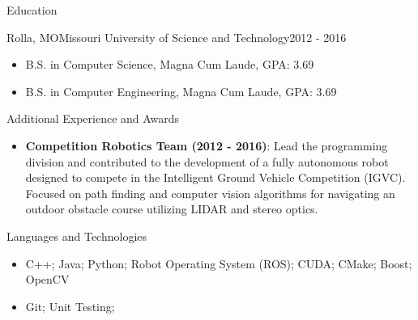 \documentclass[]{mcdowellcv}
\begin{document}
\begin{cvsection}{Education}
    \begin{cvsubsection}[2]{Rolla, MO}{Missouri University of Science and Technology}{2012 - 2016}
        \begin{itemize}
            \item B.S. in Computer Science, Magna Cum Laude, GPA: 3.69
            \item B.S. in Computer Engineering, Magna Cum Laude, GPA: 3.69
        \end{itemize}
    \end{cvsubsection}
\end{cvsection} 

\begin{cvsection}{Additional Experience and Awards}
    \begin{cvsubsection}{}{}{}  
        \begin{itemize} 
            \item \textbf{Competition Robotics Team (2012 - 2016)}: Lead the programming division and contributed to the development of a fully autonomous robot designed to compete in the Intelligent Ground Vehicle Competition (IGVC). Focused on path finding and computer vision algorithms for navigating an outdoor obstacle course utilizing LIDAR and stereo optics.
        \end{itemize}
    \end{cvsubsection}
\end{cvsection}

\begin{cvsection}{Languages and Technologies}
    \begin{cvsubsection}{}{}{}  
        \begin{itemize}
            \item C++; Java; Python; Robot Operating System (ROS); CUDA; CMake; Boost; OpenCV 
            \item Git; Unit Testing;
        \end{itemize}
    \end{cvsubsection}
\end{cvsection}
\end{document}

